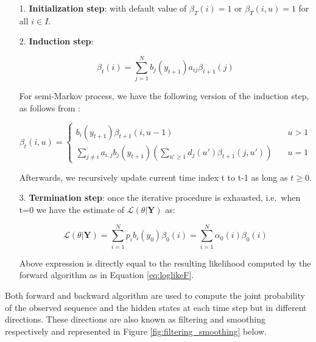\begin{itemize}
\item[1.] \textbf{Initialization step}: with default value of $\beta_T(i) = 1$ or $\beta_T(i,u) = 1$ for all $i \in I$.
\item[2.] \textbf{Induction step}: 

\begin{equation}
    \beta_t(i) = \sum\limits_{j=1}^{N} b_j(y_{t+1})a_{ij} \beta_{t+1}(j)
\end{equation}

For semi-Markov process, we have the following version of the induction step, as follows from \citep{Yu2013}:

\begin{equation}
    \beta_t(i,u) =
    \begin{cases} 
        b_i(y_{t+1}) \beta_{t+1}(i,u-1) & \quad u > 1 \\
        \sum\limits_{j \neq i} a_{i,j} b_j(y_{t+1}) \left( \sum\limits_{u' \geq 1} d_j(u') \beta_{t+1}(j,u')\right) & \quad u = 1
     \end{cases}
\end{equation}

Afterwards, we recursively update current time index t to t-1 as long as $t \geq 0$.

\item[3.] \textbf{Termination step}: once the iterative procedure is exhausted, i.e.\ when t=0 we have the estimate of $\mathcal{L}(\theta| \textbf{Y})$ as:

\begin{equation}
    \mathcal{L}(\theta| \textbf{Y}) = \sum_{i=1}^N p_{i} b_i(y_{0}) \beta_{0}(i) = \sum_{i=1}^N \alpha_0(i) \beta_{0}(i)
\end{equation}

Above expression is directly equal to the resulting likelihood computed by the forward algorithm as in Equation \ref{eq:loglikeF}.

\end{itemize}

Both forward and backward algorithm are used to compute the joint probability of the observed sequence and the hidden states at each time step but in different directions.
These directions are also known as filtering and smoothing respectively and represented in Figure \ref{fig:filtering_smoothing} below.

